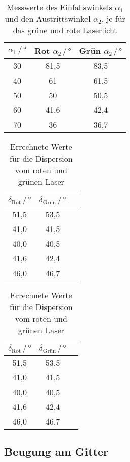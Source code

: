 \begin{table}
    \centering
    \caption{Messwerte des Einfallswinkels $\alpha_1$ und den Austrittswinkel $\alpha_2$, je für das grüne und rote Laserlicht}
    \label{tab:las}
    \begin{tabular}{c c c}
    \toprule
         $\alpha_1 \, / \, ° $ & Rot $\alpha_2 \, / \, °$ & Grün $\alpha_2 \, / \, °$\\
    \midrule
    30 & 81,5 & 83,5 \\
    40 & 61   & 61,5 \\
    50 & 50   & 50,5 \\
    60 & 41,6 & 42,4 \\
    70 & 36   & 36,7 \\
    \bottomrule
    \end{tabular}
\end{table}

\begin{table}
    \centering
    \caption{Errechnete Werte für die Dispersion vom roten und grünen Laser}
    \label{tab:dis}
    \begin{tabular}{c c c}
    \toprule
         $\delta_\text{Rot} \, / \, ° $ & $\delta_\text{Grün} \, / \, °$\\
    \midrule
    51,5 &  53,5 \\
    41,0 &  41,5 \\
    40,0 &  40,5 \\
    41,6 &  42,4 \\
    46,0 &  46,7 \\ 
    \bottomrule
    \end{tabular}
\end{table}

\begin{table}
    \centering
    \caption{Errechnete Werte für die Dispersion vom roten und grünen Laser}
    \label{tab:dis2}
    \begin{tabular}{c c c}
    \toprule
         $\delta_\text{Rot} \, / \, ° $ & $\delta_\text{Grün} \, / \, °$\\
    \midrule
    51,5 &  53,5 \\
    41,0 &  41,5 \\
    40,0 &  40,5 \\
    41,6 &  42,4 \\
    46,0 &  46,7 \\ 
    \bottomrule
    \end{tabular}
\end{table}



\subsection{Beugung am Gitter}


